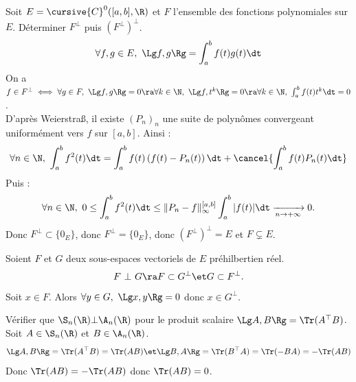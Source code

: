 \documentclass[11pt]{article}
\begin{document}
\begin{ex}{}{}
    Soit $E=\cursive{C}^0([a,b],\R)$ et $F$ l'ensemble des fonctions polynomiales sur $E$. Déterminer $F^\bot$ puis $(F^\bot)^\bot$.
    \begin{equation*}
        \forall f,g \in E, ~ \Lg f,g \Rg = \int_a^b f(t)g(t)\dt
    \end{equation*}
    \tcblower
    On a $f\in F^\bot \iff \forall g \in F, ~ \Lg f,g \Rg = 0 \ra \forall k \in \N, ~ \Lg f,t^k\Rg = 0 \ra \forall k \in \N, ~ \int_a^b f(t)t^k\dt=0$.\\
    D'après Weierstraß, il existe $(P_n)_n$ une suite de polynômes convergeant uniformément vers $f$ sur $[a,b]$. Ainsi :
    \begin{equation*}
        \forall n \in \N, ~ \int_a^b f^2(t)\dt = \int_a^b f(t)\left( f(t) - P_n(t) \right)\dt +  \cancel{\int_a^b f(t)P_n(t)\dt}
    \end{equation*}
    Puis :
    \begin{equation*}
        \forall n \in \N, ~ 0 \leq \int_a^b f^2(t)\dt \leq \|P_n - f\|_{\infty}^{[a,b]} \int_a^b|f(t)|\dt \xrightarrow[n\to+\infty]{}0.
    \end{equation*}
    Donc $F^{\bot} \subset \{0_E\}$, donc $F^\bot = \{0_E\}$, donc $(F^\bot)^\bot = E$ et $F\subsetneq E$.
\end{ex}

\begin{prop}{}{}
    Soient $F$ et $G$ deux sous-espaces vectoriels de $E$ préhilbertien réel.
    \begin{equation*}
        F ~ \bot ~ G \ra F \subset G^\bot \et G \subset F^\bot.
    \end{equation*}
    \tcblower
    Soit $x\in F$. Alors $\forall y \in G, ~ \Lg x, y \Rg = 0$ donc $x\in G^\bot$.
\end{prop}

\vspace*{-0.7cm}

\begin{exercice}{}{}
    Vérifier que $\S_n(\R) \bot \A_n(\R)$ pour le produit scalaire $\Lg A,B \Rg = \Tr(A^\top B)$.
    \tcblower
    Soit $A\in\S_n(\R)$ et $B\in\A_n(\R)$.
    \begin{equation*}
        \Lg A, B \Rg = \Tr(A^\top B) = \Tr(AB) \et \Lg B, A \Rg = \Tr(B^\top A) = \Tr(-BA)= -\Tr(AB)
    \end{equation*}
    Donc $\Tr(AB)=-\Tr(AB)$ donc $\Tr(AB)=0$. 
\end{exercice}
\end{document}
